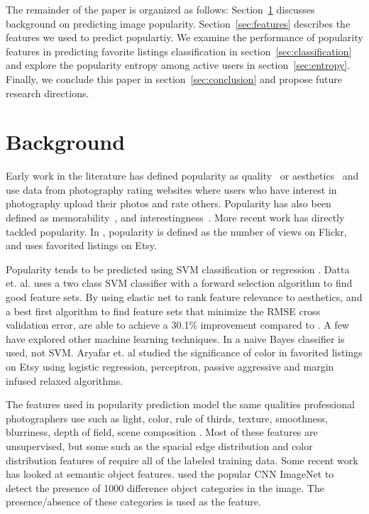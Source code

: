 \documentclass[conference,a4paper]{IEEEtran}
\begin{document}
The remainder of the paper is organized as follows:
Section~\ref{sec:background} discusses background on predicting image popularity.
Section~\ref{sec:features} describes the features we used to predict populartiy.  We examine the
performance of popularity features in predicting favorite listings classification in
section~\ref{sec:classification} and explore the popularity entropy among active users in
section~\ref{sec:entropy}. Finally, we conclude this paper in
section~\ref{sec:conclusion} and propose future research directions.

\section{Background}
\label{sec:background}
Early work in the literature has defined popularity as quality~\cite{ke2006design} or aesthetics~\cite{datta2006studying} and use data from photography rating websites where users who have interest in photography upload their photos and rate others.  Popularity has also been defined as memorability~\cite{isola2011makes}, and interestingness~\cite{dhar2011high,gygli2013interestingness}.  More recent work has directly tackled popularity.  In \cite{khosla2014makes}, popularity is defined as the number of views on Flickr, and \cite{aryafar2014exploring} uses favorited listings on Etsy.

Popularity tends to be predicted using SVM classification or regression \cite{datta2006studying} \cite{khosla2014makes} \cite{chen2014aesthetic} \cite{wang2015automatic}.  Datta et. al. \cite{datta2006studying} uses a two class SVM classifier with a forward selection algorithm to find good feature sets.  By using elastic net to rank feature relevance to aesthetics, and a best first algorithm to find feature sets that minimize the RMSE cross validation error, \cite{wang2015automatic} are able to achieve a 30.1\% improvement compared to \cite{chen2014aesthetic}.  A few have explored other machine learning techniques.  In \cite{ke2006design} a naive Bayes classifier is used, not SVM.  Aryafar et. al \cite{aryafar2014exploring} studied the significance of color in favorited listings on Etsy using logistic regression, perceptron, passive aggressive and margin infused relaxed algorithms.

The features used in popularity prediction model the same qualities professional photographers use such as light, color, rule of thirds, texture, smoothness, blurriness, depth of field, scene composition \cite{ke2006design} \cite{datta2006studying} \cite{chen2014aesthetic} \cite{wang2015automatic}.  Most of these features are unsupervised, but some such as the spacial edge distribution and color distribution features of \cite{ke2006design} require all of the labeled training data.  Some recent work has looked at semantic object features.  \cite{khosla2014makes} used the popular CNN ImageNet to detect the presence of 1000 difference object categories in the image.  The presence/absence of these categories is used as the feature.
\end{document}
